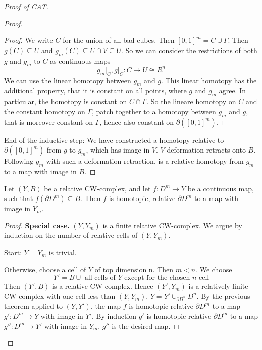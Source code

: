 \documentclass{TemplateLecture}
\begin{document}
\begin{proof}[Proof of CAT]
\begin{proof}
\begin{proof}
            We write \(C\) for the union of all bad cubes. Then \([0,1]^m = C\cup \Gamma\). Then \(g(C) \subseteq U\) and \(g_m(C) \subseteq U \cap V \subseteq U\). So we can consider the restrictions of both \(g\) and \(g_m\) to \(C\) as continuous maps
            \[g_m\rvert_C, g\rvert_C \colon C \to U \cong R^n\]
            We can use the linear homotopy between \(g_m\) and \(g\). This linear homotopy has the additional property, that it is constant on all points, where \(g\) and \(g_m\) agree. In particular, the homotopy is constant on \(C\cap \Gamma\).
            So the lineare homotopy on \(C\) and the constant homotopy on \(\Gamma\), patch together to a homotopy between \(g_m\) and \(g\), that is moreover constant on \(\Gamma\), hence also constant on \(\partial([0,1]^m)\).
        \end{proof}
        End of the inductive step: We have constructed a homotopy relative to \(\partial([0,1]^m)\) from \(g\) to \(g_m\), which has image in \(V\). \(V\) deformation retracts onto \(B\). Following \(g_m\) with such a deformation retraction, is a relative homotopy from \(g_m\) to a map with image in \(B\).
    \end{proof}

    \begin{thm}{}{}
        Let \((Y,B)\) be a relative CW-complex, and let \(f\colon D^m \to Y\) be a continuous map, such that \(f(\partial D^m) \subseteq B\). Then \(f\) is homotopic,  relative \(\partial D^m\) to a map with image in \(Y_m\).
    \end{thm}
    \begin{proof}
        \textbf{Special case.} \((Y, Y_m)\) is a finite relative CW-complex.
        We argue by induction on the number of relative cells of \((Y, Y_m)\). 
        
        Start: \(Y = Y_m\) is trivial.

        Otherwise, choose a cell of \(Y\) of top dimension n. Then \(m < n\). We choose
        \[Y' = B \cup \text{ all cells of \(Y\) except for the chosen \(n\)-cell}\]
        Then \((Y', B)\) is a relative CW-complex. Hence \((Y', Y_m)\) is a relatively finite CW-complex with one cell less than \((Y, Y_m)\). \(Y = Y' \cup_{\partial D^n} D^n\). By the previous theorem applied to \((Y, Y')\), the map \(f\) is homotopic relative \(\partial D^m\) to a map \(g'\colon D^m \to Y\) with image in \(Y'\). By induction \(g'\) is homotopic relative \(\partial D^m\) to a map \(g''\colon D^m \to Y'\) with image in \(Y_m\). \(g''\) is the desired map.


\end{proof}
\end{proof}
\end{document}
